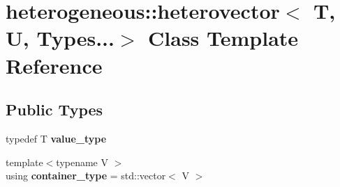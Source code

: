 \hypertarget{classheterogeneous_1_1heterovector_3_01_t_00_01_u_00_01_types_8_8_8_4}{}\section{heterogeneous\+:\+:heterovector$<$ T, U, Types...$>$ Class Template Reference}
\label{classheterogeneous_1_1heterovector_3_01_t_00_01_u_00_01_types_8_8_8_4}
\subsection*{Public Types}
\begin{DoxyCompactItemize}
\item 
\hypertarget{classheterogeneous_1_1heterovector_3_01_t_00_01_u_00_01_types_8_8_8_4_aab57f48cc197e487ffe4d553b03e7f07}{}typedef T {\bfseries value\+\_\+type}\label{classheterogeneous_1_1heterovector_3_01_t_00_01_u_00_01_types_8_8_8_4_aab57f48cc197e487ffe4d553b03e7f07}

\item 
\hypertarget{classheterogeneous_1_1heterovector_3_01_t_00_01_u_00_01_types_8_8_8_4_adc0f7747a19dc3beb95f7ccadf23eaf9}{}{\footnotesize template$<$typename V $>$ }\\using {\bfseries container\+\_\+type} = std\+::vector$<$ V $>$\label{classheterogeneous_1_1heterovector_3_01_t_00_01_u_00_01_types_8_8_8_4_adc0f7747a19dc3beb95f7ccadf23eaf9}

\end{DoxyCompactItemize}
